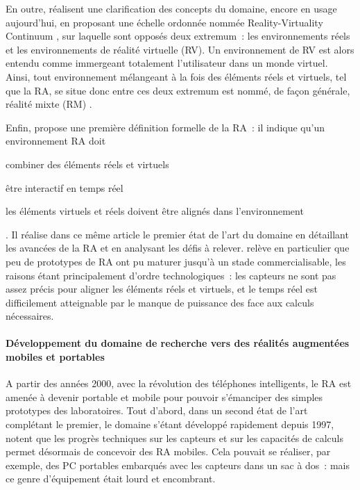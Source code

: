 En outre, \citet{MilgramKishino1994} réalisent une clarification des concepts du domaine, encore en usage aujourd'hui, en proposant une échelle ordonnée nommée \foreignlanguage{english}{Reality-Virtuality Continuum} , sur laquelle sont opposés deux extremum~: les environnements réels et les environnements de réalité virtuelle (RV). Un environnement de RV est alors entendu comme immergeant totalement l'utilisateur dans un monde virtuel. Ainsi, tout environnement mélangeant à la fois des éléments réels et virtuels, tel que la RA, se situe donc entre ces deux extremum est nommé, de façon générale, réalité mixte (RM) \citep{MilgramKishino1994}.

Enfin, \citet{Azuma1997} propose une première définition formelle de la RA~: il indique qu'un environnement RA doit 
\begin{enumerate*}[label=\emph{\arabic*})]
\item combiner des éléments réels et virtuels
\item être interactif en temps réel
\item les éléments virtuels et réels doivent être alignés dans l'environnement
\end{enumerate*}. Il réalise dans ce même article le premier état de l'art du domaine en détaillant les avancées de la RA et en analysant les défis à relever. \citet{Azuma1997} relève en particulier que peu de prototypes de RA ont pu maturer jusqu'à un stade commercialisable, les raisons étant principalement d'ordre technologiques~: les capteurs ne sont pas assez précis pour aligner les éléments réels et virtuels, et le temps réel est difficilement atteignable par le manque de puissance des face aux calculs nécessaires.


\paragraph*{Développement du domaine de recherche vers des réalités augmentées mobiles et portables}
A partir des années 2000, avec la révolution des téléphones intelligents, le RA est amenée à devenir portable et mobile pour pouvoir s'émanciper des simples prototypes des laboratoires. Tout d'abord, dans un second état de l'art complétant le premier, le domaine s'étant développé rapidement depuis 1997, \citet{AzumaBaillotBehringerEtAl2001} notent  que les progrès techniques sur les capteurs et sur les capacités de calculs permet désormais de concevoir des RA mobiles. Cela pouvait se réaliser, par exemple, des PC portables embarqués avec les capteurs dans un sac à dos~: mais ce genre d'équipement était lourd et encombrant. \citep{DeSaChurchill2013}

